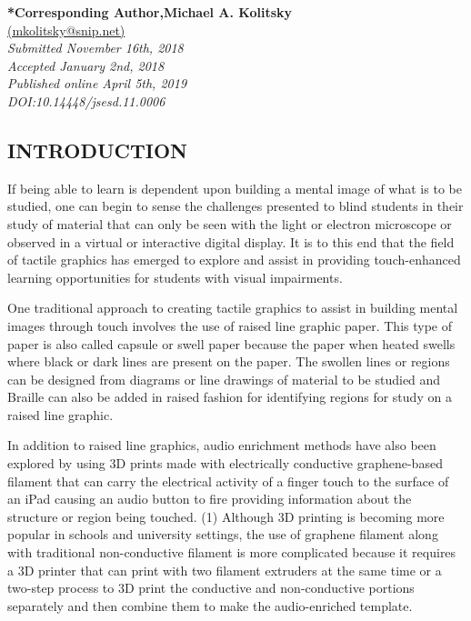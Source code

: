 \documentclass[11.5pt]{sig-alternate} %
\begin{document}
\textbf{*Corresponding Author,Michael A. Kolitsky }\\
\href{mailto: mkolitsky@snip.net}{(mkolitsky@snip.net)} \\
\textit{Submitted  November 16th, 2018}\\
\textit{Accepted January 2nd, 2018} \\
\textit{Published online April 5th, 2019} \\
\textit{DOI:10.14448/jsesd.11.0006} \\
\pagebreak
\clearpage
\begin{large}

\section*{INTRODUCTION}

If being able to learn is dependent upon building a mental image of what is to be studied, one can begin to sense the challenges presented to blind students in their study of material that can only be seen with the light or electron microscope or observed in a virtual or interactive digital display.  It is to this end that the field of tactile graphics has emerged to explore and assist in providing touch-enhanced learning opportunities for students with visual impairments.     

One traditional approach to creating tactile graphics to assist in building mental images through touch involves the use of raised line graphic paper.  This type of paper is also called capsule or swell paper because the paper when heated swells where black or dark lines are present on the paper.  The swollen lines or regions can be designed from diagrams or line drawings of material to be studied and Braille can also be added in raised fashion for identifying regions for study on a raised line graphic.  

In addition to raised line graphics, audio enrichment methods have also been explored by using 3D prints made with electrically conductive graphene-based filament that can carry the electrical activity of a finger touch to the surface of an iPad causing an audio button to fire providing information about the structure or region being touched. (1)  Although 3D printing is becoming more popular in schools and university settings, the use of graphene filament along with traditional non-conductive filament is more complicated because it requires a 3D printer that can print with two filament extruders at the same time or a two-step process to 3D print the conductive and non-conductive portions separately and then combine them to make the audio-enriched template.  


\end{large}
\end{document}
